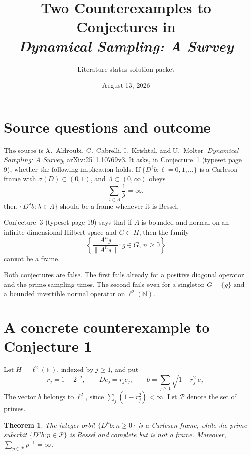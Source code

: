 \documentclass[11pt]{article}
\title{Two Counterexamples to Conjectures in\\
\emph{Dynamical Sampling: A Survey}}
\author{Literature-status solution packet}
\date{August 13, 2026}
\newtheorem{theorem}{Theorem}
\newcommand{\N}{\mathbb N}
\newcommand{\Pp}{\mathcal P}
\begin{document}
\maketitle

\begin{center}
\end{center}

\section{Source questions and outcome}

The source is A.~Aldroubi, C.~Cabrelli, I.~Krishtal, and U.~Molter,
\emph{Dynamical Sampling: A Survey}, arXiv:2511.10769v3.  It asks, in
Conjecture~1 (typeset page 9), whether the following implication holds.  If
\(\{D^\ell b:\ell=0,1,\ldots\}\) is a Carleson frame with
\(\sigma(D)\subset(0,1)\), and \(\Lambda\subset(0,\infty)\) obeys
\[
  \sum_{\lambda\in\Lambda}\frac1\lambda=\infty,
\]
then \(\{D^\lambda b:\lambda\in\Lambda\}\) should be a frame whenever it
is Bessel.

Conjecture~3 (typeset page 19) says that if \(A\) is bounded and normal on
an infinite-dimensional Hilbert space and \(G\subset H\), then the family
\[
 \left\{\frac{A^n g}{\lVert A^n g\rVert}:g\in G,\ n\geq0\right\}
\]
cannot be a frame.

Both conjectures are false.  The first fails already for a positive diagonal
operator and the prime sampling times.  The second fails even for a singleton
\(G=\{g\}\) and a bounded invertible normal operator on \(\ell^2(\N)\).

\section{A concrete counterexample to Conjecture 1}

Let \(H=\ell^2(\N)\), indexed by \(j\geq1\), and put
\[
 r_j=1-2^{-j},\qquad De_j=r_je_j,\qquad
 b=\sum_{j\geq1}\sqrt{1-r_j^2}\,e_j.
\]
The vector \(b\) belongs to \(\ell^2\), since
\(\sum_j(1-r_j^2)<\infty\).  Let \(\Pp\) denote the set of primes.

\begin{theorem}
The integer orbit \(\{D^n b:n\geq0\}\) is a Carleson frame, while the
prime suborbit \(\{D^p b:p\in\Pp\}\) is Bessel and complete but is not a
frame.  Moreover, \(\sum_{p\in\Pp}p^{-1}=\infty\).
\end{theorem}
\end{document}
